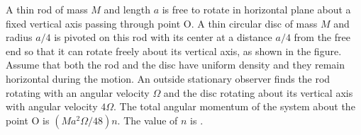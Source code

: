 \item A thin rod of mass $M$ and length $a$ is free to rotate in horizontal plane about a fixed vertical axis passing through point O. A thin circular disc of mass $M$ and radius $a/4$ is pivoted on this rod with its center at a distance $a/4$ from the free end so that it can rotate freely about its vertical axis, as shown in the figure. Assume that both the rod and the disc have uniform density and they remain horizontal during the motion. An outside stationary observer finds the rod rotating with an angular velocity $\Omega$ and the disc rotating about its vertical axis with angular velocity $4\Omega$. The total angular momentum of the system about the point O is $(Ma^{2}\Omega/48)n$. The value of $n$ is \underline{\hspace{2.5 cm}}. 
    
    \begin{center}
    \end{center}

